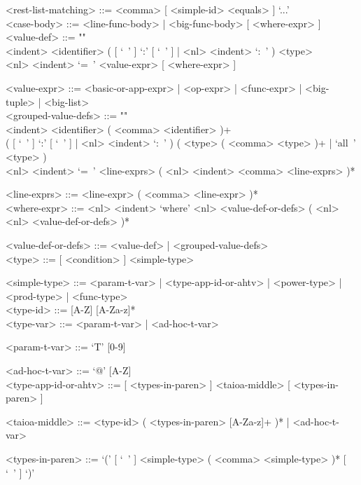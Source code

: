 \documentclass{article}
\begin{document}
\begin{grammar}
<rest-list-matching> ::= <comma> [ <simple-id> <equals> ] `...'
\\

<case-body> ::= <line-func-body> | <big-func-body> [ <where-expr> ]
\\

<value-def> ::= ""\\
<indent> <identifier>
( [ `\ ' ] `:' [ `\ ' ] | <nl> <indent> `:\ ' ) <type>  \\
<nl> <indent> `=\ ' <value-expr> [ <where-expr> ]

<value-expr> ::=
<basic-or-app-expr> | <op-expr> | <func-expr> | <big-tuple> | <big-list>
\\

<grouped-value-defs> ::= ""\\
<indent> <identifier> ( <comma> <identifier> )+ \\
( [ `\ ' ] `:' [ `\ ' ] | <nl> <indent> `:\ ' )
( <type> ( <comma> <type> )+ | `all\ ' <type> ) \\
<nl> <indent> `=\ ' <line-exprs> ( <nl> <indent> <comma> <line-exprs> )*

<line-exprs> ::= <line-expr> ( <comma> <line-expr> )*
\\

<where-expr> ::=
<nl> <indent> `where'
<nl> <value-def-or-defs> ( <nl> <nl> <value-def-or-defs> )*

<value-def-or-defs> ::= <value-def> | <grouped-value-defs>
\\

<type> ::= [ <condition> ]  <simple-type>

<simple-type> ::=
<param-t-var> | <type-app-id-or-ahtv> | <power-type> | <prod-type> |
<func-type>
\\

<type-id> ::= [A-Z] [A-Za-z]*
\\

<type-var> ::= <param-t-var> | <ad-hoc-t-var>

<param-t-var> ::= `T' [0-9]

<ad-hoc-t-var> ::= `@' [A-Z]
\\

<type-app-id-or-ahtv> ::=
[ <types-in-paren> ] <taioa-middle> [ <types-in-paren> ]

<taioa-middle> ::=
<type-id> ( <types-in-paren> [A-Za-z]+ )* | <ad-hoc-t-var>

<types-in-paren> ::=
`(' [ `\ ' ] <simple-type> ( <comma> <simple-type> )* [ `\ ' ] `)'
\\


\end{grammar}
\end{document}
